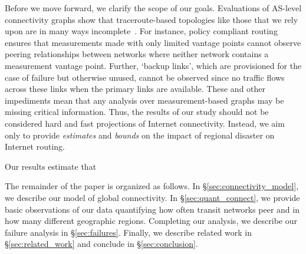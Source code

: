 Before we move forward, we clarify the scope of our goals.  
Evaluations of AS-level connectivity graphs show that traceroute-based
topologies like those that we rely upon are in many ways
incomplete~\cite{walter}.  For instance, policy compliant routing ensures that
measurements made with only limited vantage points cannot observe peering
relationships between networks where neither network contains a measurement
vantage point.  Further, `backup links', which are provisioned for the case of
failure but otherwise unused, cannot be observed since no traffic flows across
these links when the primary links are available.  These and other impediments
mean that any analysis over measurement-based graphs may be missing critical
information.  Thus, the results of our study should not be considered hard and
fast projections of Internet connectivity.  Instead, we aim only to provide
{\it estimates} and {\it bounds} on the impact of regional disaster on Internet
routing.

Our results estimate that \justine{\ldots}

The remainder of the paper is organized as follows. In \S\ref{sec:connectivity_model}, we describe our model of global connectivity.
In \S\ref{sec:quant_connect}, we provide basic observations of our data quantifying how often transit networks peer and in how many different geographic regions.
Completing our analysis, we describe our failure analysis in \S\ref{sec:failures}.
Finally, we describe related work in  \S\ref{sec:related_work} and conclude in \S\ref{sec:conclusion}.
